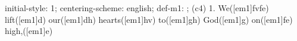 initial-style: 1;
centering-scheme: english;
def-m1: \grealign;
(c4) 1. We([em1]fvfe) lift([em1]d) our([em1]dh) hearts([em1]hv) to([em1]gh) God([em1]g) on([em1]fe) high,([em1]e)